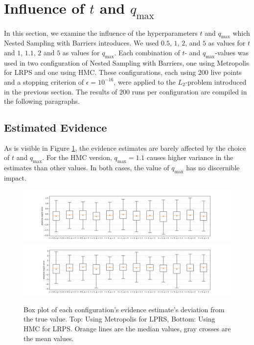 \documentclass[12pt, a4paper]{report}
\begin{document}
\FloatBarrier
\section{Influence of $t$ and $q_{\textrm{max}}$}
In this section, we examine the influence of the hyperparameters $t$ and $q_{\textrm{max}}$ which Nested Sampling with Barriers introduces.
We used $0.5$, $1$, $2$, and $5$ as values for $t$ and $1$, $1.1$, $2$ and $5$ as values for $q_{\textrm{max}}$.
Each combination of $t$- and $q_{\textrm{max}}$-values was used in two configuration of Nested Sampling with Barriers, one using Metropolis for LRPS and one using HMC.
These configurations, each using 200 live points and a stopping criterion of $\epsilon=10^{-16}$, were applied to the $L_2$-problem introduced in the previous section.
The results of 200 runs per configuration are compiled in the following paragraphs.

\subsection{Estimated Evidence}
As is visible in Figure \ref{fig:results_params_logZ}, the evidence estimates are barely affected by the choice of $t$ and $q_{\textrm{max}}$.
For the HMC version, $q_{\textrm{max}} = 1.1$ causes higher variance in the estimates than other values.
In both cases, the value of $q_{\textrm{max}}$ has no discernible impact.
\begin{figure}
    \centering
    \includegraphics[trim={3cm 0cm 3cm 0cm}, clip, width=\textwidth]{figs/results/params/logZ_diffs_metropolis.png}
    \includegraphics[trim={3cm 0cm 3cm 0cm}, clip, width=\textwidth]{figs/results/params/logZ_diffs_hmc.png}
    \caption{Box plot of each configuration's evidence estimate's deviation from the true value. Top: Using Metropolis for LPRS, Bottom: Using HMC for LRPS. Orange lines are the median values, gray crosses are the mean values.}
    \label{fig:results_params_logZ}
\end{figure}
\end{document}
